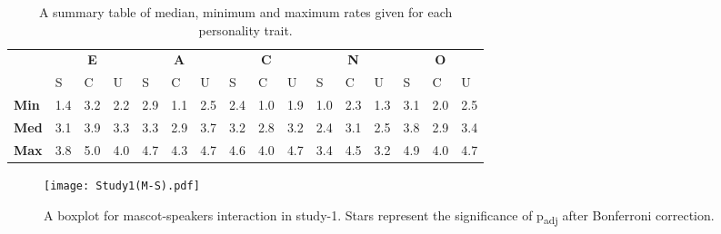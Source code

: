 \begin{table}[H]
    \renewcommand{\arraystretch}{1}
    \begin{center}
        \begin{tabular}{p{}|
        p{}|p{}|p{}||
        p{}|p{}|p{}||
        p{}|p{}|p{}||
        p{}|p{}|p{}||
        p{}|p{}|p{}|}
            \cline{2-16}
            & \multicolumn{3}{c||}{\textbf{E}} & \multicolumn{3}{c||}{\textbf{A}}
            & \multicolumn{3}{c||}{\textbf{C}} &  \multicolumn{3}{c||}{\textbf{N}} & \multicolumn{3}{c|}{\textbf{O}} \\
            \cline{2-16}
            & S & C & U & S & C & U & S & C & U & S & C & U & S & C & U            \\
            \cline{2-16}
            \textbf{Min}    & 1.4 & 3.2 & 2.2 & 2.9 & 1.1 & 2.5 & 2.4 & 1.0 & 1.9 & 1.0 & 2.3 & 1.3 & 3.1 & 2.0 & 2.5 \\
            \textbf{Med}    & 3.1 & 3.9 & 3.3 & 3.3 & 2.9 & 3.7 & 3.2 & 2.8 & 3.2 & 2.4 & 3.1 & 2.5 & 3.8 & 2.9 & 3.4\\
            \textbf{Max}    & 3.8 & 5.0 & 4.0 & 4.7 & 4.3 & 4.7 & 4.6 & 4.0 & 4.7 & 3.4 & 4.5 & 3.2 & 4.9 & 4.0 & 4.7\\
            \cline{2-16}
        \end{tabular}
        \caption[]{A summary table of median, minimum and maximum rates given for each personality trait.\footnotemark}
        \label{table:medianMS1}
    \end{center}
\end{table}
\begin{figure}[H]
    \centering
    \texttt{[image: Study1(M-S).pdf]}
    \caption[]{A boxplot for mascot-speakers interaction in study-1.
    Stars represent the significance of p\textsubscript{adj} after Bonferroni correction.\footnotemark}
    \label{fig:MS1}
\end{figure}

